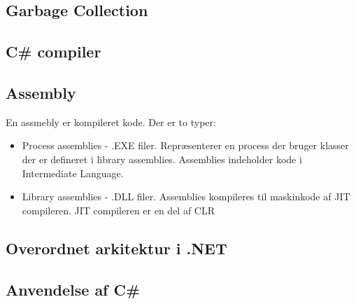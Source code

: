 \subsection{Garbage Collection}

\subsection{C\# compiler}

\subsection{Assembly}
En assmebly er kompileret kode. Der er to typer:
\begin{itemize}
	\item Process assemblies - .EXE filer. Repræsenterer en process der bruger klasser der er defineret i library assemblies. Assemblies indeholder kode i Intermediate Language.
	\item Library assemblies - .DLL filer.
	Assemblies kompileres til maskinkode af JIT compileren. JIT compileren er en del af CLR
\end{itemize}

\subsection{Overordnet arkitektur i .NET}

\subsection{Anvendelse af C\#}